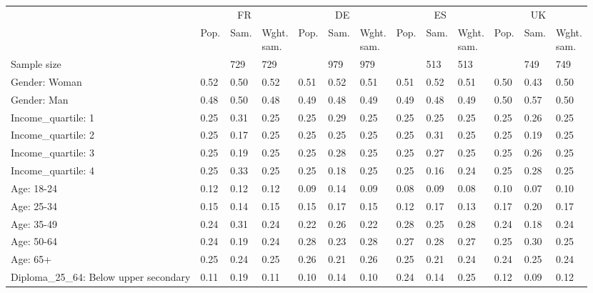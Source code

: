 
\begin{tabular}[t]{lllllllllllll}
\toprule
\multicolumn{1}{c}{} & \multicolumn{3}{c}{FR} & \multicolumn{3}{c}{DE} & \multicolumn{3}{c}{ES} & \multicolumn{3}{c}{UK} \\
\cmidrule(l{3pt}r{3pt}){2-4} \cmidrule(l{3pt}r{3pt}){5-7} \cmidrule(l{3pt}r{3pt}){8-10} \cmidrule(l{3pt}r{3pt}){11-13}
  & Pop. & Sam. & \makecell{Wght.\\sam.} & Pop. & Sam. & \makecell{Wght.\\sam.} & Pop. & Sam. & \makecell{Wght.\\sam.} & Pop. & Sam. & \makecell{Wght.\\sam.}\\
\midrule
Sample size &  & 729 & 729 &  & 979 & 979 &  & 513 & 513 &  & 749 & 749\\
\addlinespace
Gender: Woman & 0.52 & 0.50 & 0.52 & 0.51 & 0.52 & 0.51 & 0.51 & 0.52 & 0.51 & 0.50 & 0.43 & 0.50\\
Gender: Man & 0.48 & 0.50 & 0.48 & 0.49 & 0.48 & 0.49 & 0.49 & 0.48 & 0.49 & 0.50 & 0.57 & 0.50\\
\addlinespace
Income\_quartile: 1 & 0.25 & 0.31 & 0.25 & 0.25 & 0.29 & 0.25 & 0.25 & 0.25 & 0.25 & 0.25 & 0.26 & 0.25\\
Income\_quartile: 2 & 0.25 & 0.17 & 0.25 & 0.25 & 0.25 & 0.25 & 0.25 & 0.31 & 0.25 & 0.25 & 0.19 & 0.25\\
Income\_quartile: 3 & 0.25 & 0.19 & 0.25 & 0.25 & 0.28 & 0.25 & 0.25 & 0.27 & 0.25 & 0.25 & 0.26 & 0.25\\
Income\_quartile: 4 & 0.25 & 0.33 & 0.25 & 0.25 & 0.18 & 0.25 & 0.25 & 0.16 & 0.24 & 0.25 & 0.28 & 0.25\\
\addlinespace
Age: 18-24 & 0.12 & 0.12 & 0.12 & 0.09 & 0.14 & 0.09 & 0.08 & 0.09 & 0.08 & 0.10 & 0.07 & 0.10\\
Age: 25-34 & 0.15 & 0.14 & 0.15 & 0.15 & 0.17 & 0.15 & 0.12 & 0.17 & 0.13 & 0.17 & 0.20 & 0.17\\
Age: 35-49 & 0.24 & 0.31 & 0.24 & 0.22 & 0.26 & 0.22 & 0.28 & 0.25 & 0.28 & 0.24 & 0.18 & 0.24\\
Age: 50-64 & 0.24 & 0.19 & 0.24 & 0.28 & 0.23 & 0.28 & 0.27 & 0.28 & 0.27 & 0.25 & 0.30 & 0.25\\
Age: 65+ & 0.25 & 0.24 & 0.25 & 0.26 & 0.21 & 0.26 & 0.25 & 0.21 & 0.24 & 0.24 & 0.25 & 0.24\\
\addlinespace
Diploma\_25\_64: Below upper secondary & 0.11 & 0.19 & 0.11 & 0.10 & 0.14 & 0.10 & 0.24 & 0.14 & 0.25 & 0.12 & 0.09 & 0.12\\

\end{tabular}
